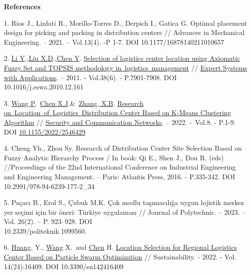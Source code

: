 \begin{center}
{\bfseries References}
\end{center}

\begin{references}
1. Rios J., Linfati R., Morillo-Torres D., Derpich I., Gatica G. Optimal
placement design for picking and packing in distribution centers //
Advances in Mechanical Engineering. -- 2021. -- Vol.13(4). -P 1-7. DOI
10.1177/16878140211010657

2. \href{https://www.webofscience.com/wos/author/record/28556133}{Li
Y}.,\href{https://www.webofscience.com/wos/author/record/32561100}{Liu
X.D}.,\href{https://www.webofscience.com/wos/author/record/6098832}{Chen
Y}.
\href{https://www.webofscience.com/wos/woscc/full-record/WOS:000288343900166}{Selection
of logistics center location using Axiomatic Fuzzy Set and TOPSIS
methodology in~logistics~management} //
\href{https://www.sciencedirect.com/journal/expert-systems-with-applications}{Expert
Systems with Applications}. -- 2011. - Vol.38(6). - P.7901-7908. DOI
10.1016/j.eswa.2010.12.161

3. \href{https://www.webofscience.com/wos/author/record/14795379}{Wang
P},~\href{https://www.webofscience.com/wos/author/record/36107182}{Chen
X.J}.\&~\href{https://www.webofscience.com/wos/author/record/32493117}{Zhang,
X.B}.
\href{https://www.webofscience.com/wos/woscc/full-record/WOS:000830775300005}{Research
on~Location~of~Logistics~Distribution Center Based on K-Means
Clustering Algorithm} //
\href{https://www.researchgate.net/journal/Security-and-Communication-Networks-1939-0122}{Security
and Communication Networks}. -- 2022. -~Vol.8. - P.1-9. DOI
\href{http://dx.doi.org/10.1155/2022/2546429}{10.1155/2022/2546429}

4. Cheng Yh., Zhou Sy. Research of Distribution Center Site Selection
Based on Fuzzy Analytic Hierarchy Process / In book: Qi E., Shen J.,
Dou R. (eds) //Proceedings of the 22nd International Conference on
Industrial Engineering and Engineering Management. -- Paris: Atlantis
Press, 2016. - P.335-342. DOI 10.2991/978-94-6239-177-2\_34

5. Paçacı B., Erol S., Çubuk M.K. Çok modlu taşımacılığa uygun lojistik
merkez yer seçimi için bir öneri: Türkiye uygulaması // Journal of
Polytechnic. -- 2023. -- Vol. 26(2). -- P. 923--928. DOI\\
10.2339/politeknik.1099560.

6. \href{https://sciprofiles.com/profile/693277}{Huang}, Y.,
\href{https://sciprofiles.com/profile/2635021}{Wang} X.~and
\href{https://sciprofiles.com/profile/author/dFBVb3FoaXR6WVFmWlV5M0h1dGNXZz09}{Chen}
H. \href{https://www.mdpi.com/2071-1050/14/24/16409}{Location
Selection for Regional Logistics Center Based on Particle Swarm
Optimization} // Sustainability. - 2022. - Vol. 14(24):16409. DOI
10.3390/su142416409


\end{references}
